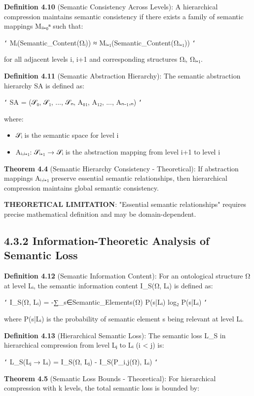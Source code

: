 \textbf{Definition 4.10} (Semantic Consistency Across Levels): A hierarchical compression maintains semantic consistency if there exists a family of semantic mappings {Mᵢ}ᵢ₌₀ⁿ such that:

\texttt{`}
Mᵢ(Semantic_Content(Ωᵢ)) ≈ Mᵢ₊₁(Semantic_Content(Ωᵢ₊₁))
\texttt{`}

for all adjacent levels i, i+1 and corresponding structures Ωᵢ, Ωᵢ₊₁.

\textbf{Definition 4.11} (Semantic Abstraction Hierarchy): The semantic abstraction hierarchy SA is defined as:

\texttt{`}
SA = (𝒮₀, 𝒮₁, ..., 𝒮ₙ, A₀₁, A₁₂, ..., Aₙ₋₁,ₙ)
\texttt{`}

where:
\begin{itemize}
\item 𝒮ᵢ is the semantic space for level i
\item Aᵢ,ᵢ₊₁: 𝒮ᵢ₊₁ → 𝒮ᵢ is the abstraction mapping from level i+1 to level i
\end{itemize}

\textbf{Theorem 4.4} (Semantic Hierarchy Consistency - Theoretical): If abstraction mappings Aᵢ,ᵢ₊₁ preserve essential semantic relationships, then hierarchical compression maintains global semantic consistency.

\textbf{THEORETICAL LIMITATION}: "Essential semantic relationships" requires precise mathematical definition and may be domain-dependent.

\subsection{4.3.2 Information-Theoretic Analysis of Semantic Loss}

\textbf{Definition 4.12} (Semantic Information Content): For an ontological structure Ω at level Lᵢ, the semantic information content I_S(Ω, Lᵢ) is defined as:

\texttt{`}
I_S(Ω, Lᵢ) = -∑_{s∈Semantic_Elements(Ω)} P(s|Lᵢ) log₂ P(s|Lᵢ)
\texttt{`}

where P(s|Lᵢ) is the probability of semantic element s being relevant at level Lᵢ.

\textbf{Definition 4.13} (Hierarchical Semantic Loss): The semantic loss L_S in hierarchical compression from level Lⱼ to Lᵢ (i < j) is:

\texttt{`}
L_S(Lⱼ → Lᵢ) = I_S(Ω, Lⱼ) - I_S(P_{i,j}(Ω), Lᵢ)
\texttt{`}

\textbf{Theorem 4.5} (Semantic Loss Bounds - Theoretical): For hierarchical compression with k levels, the total semantic loss is bounded by:

